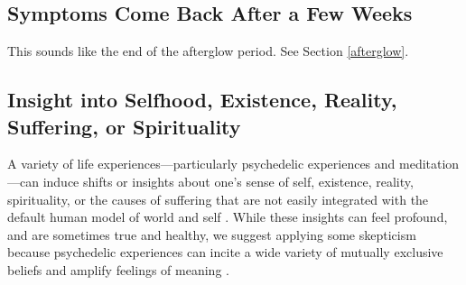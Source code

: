 \documentclass[12pt,letterpaper]{book}
\begin{document}
\subsection*{Symptoms Come Back After a Few Weeks}
This sounds like the end of the afterglow period. See Section \ref{afterglow}.
\subsection*{Insight into Selfhood, Existence, Reality, Suffering, or Spirituality}
\label{selfinsight}
A variety of life experiences—particularly psychedelic experiences and meditation—can induce shifts or insights about one's sense of self, existence, reality, spirituality, or the causes of suffering that are not easily integrated with the default human model of world and self \cite{evans2020}. While these insights can feel profound, and are sometimes true and healthy, we suggest applying some skepticism because psychedelic experiences can incite a wide variety of mutually exclusive beliefs and amplify feelings of meaning \cite{hartogsohn2018meaning}.
\end{document}
